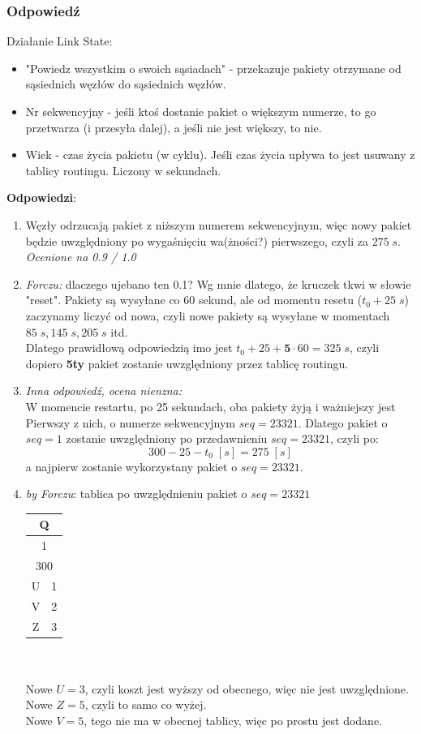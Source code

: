 		\subsubsection{Odpowiedź}
			Działanie Link State:
			\begin{itemize}
				\item "Powiedz wszystkim o swoich sąsiadach" - przekazuje pakiety otrzymane od sąsiednich węzłów do sąsiednich węzłów.
				\item Nr sekwencyjny - jeśli ktoś dostanie pakiet o większym numerze, to go przetwarza (i przesyła dalej), a jeśli nie jest większy, to nie.
				\item Wiek - czas życia pakietu (w cyklu). Jeśli czas życia upływa to jest usuwany z tablicy routingu. Liczony w sekundach.
			\end{itemize}
\newpage
			\textbf{Odpowiedzi}:
			\begin{enumerate}
				\item Węzły odrzucają pakiet z niższym numerem sekwencyjnym, więc nowy pakiet będzie uwzględniony po wygaśnięciu wa(żności?) pierwszego, czyli za $ 275\;s $.\\
				\small{ \emph{Ocenione na 0.9 / 1.0}}
				\item \small{ \emph{Forczu:}} dlaczego ujebano ten 0.1? Wg mnie dlatego, że kruczek tkwi w słowie "reset". Pakiety są wysyłane co 60 sekund, ale od momentu resetu ($ t_0+25\;s $) zaczynamy liczyć od nowa, czyli nowe pakiety są wysyłane w momentach $ 85\;s, 145\;s, 205\;s $ itd.\\
				Dlatego prawidłową odpowiedzią imo jest $ t_0+25+\textbf{5}\cdot{60}=325\;s $, czyli dopiero \textbf{5ty} pakiet zostanie uwzględniony przez tablicę routingu.
				\item \small{ \emph{Inna odpowiedź, ocena nienzna:}}\\
				W momencie restartu, po 25 sekundach, oba pakiety żyją i ważniejszy jest Pierwszy z nich, o numerze sekwencyjnym $ seq=23321 $. Dlatego pakiet o $ seq=1 $ zostanie uwzględniony po przedawnieniu $ seq=23321 $, czyli po:
				$$ 300 - 25 - t_0\;[s]= 275\;[s] $$
				a najpierw zostanie wykorzystany pakiet o $ seq=23321 $.
				\item \emph{by Forczu}: tablica po uwzględnieniu pakiet o $ seq=23321 $ \\
					\begin{tabular}{|c|c|}
						\hline \multicolumn{2}{|c|}{Q}  \\ 
						\hline \multicolumn{2}{|c|}{1}  \\ 
						\hline \multicolumn{2}{|c|}{300}  \\ 
						\hline U & 1 \\
						\hline V & 2 \\
						\hline Z & 3 \\ 
						\hline 
					\end{tabular}\\\\
				Nowe $ U=3 $, czyli koszt jest wyższy od obecnego, więc nie jest uwzględnione.\\
				Nowe $ Z=5 $, czyli to samo co wyżej.\\
				Nowe $ V=5 $, tego nie ma w obecnej tablicy, więc po prostu jest dodane.
		\end{enumerate}
